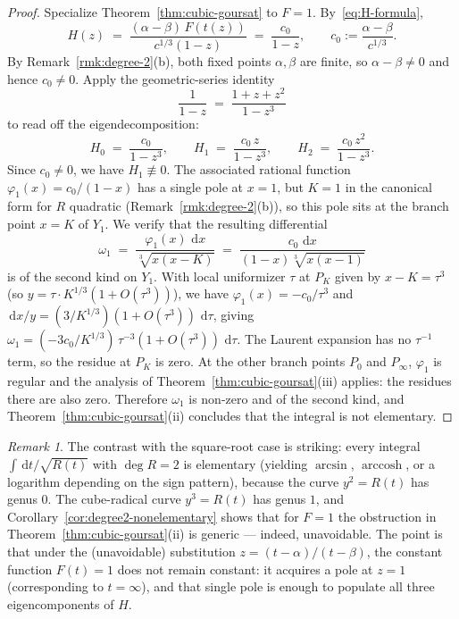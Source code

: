 \documentclass[11pt,a4paper]{article}
\theoremstyle{plain}
\theoremstyle{definition}
\theoremstyle{remark}
\newtheorem{remark}[theorem]{Remark}
\renewcommand{\d}{\,\mathrm{d}}
\begin{document}
\begin{proof}
Specialize Theorem~\ref{thm:cubic-goursat} to $F = 1$. By~\eqref{eq:H-formula},
\[
  H(z) \;=\; \frac{(\alpha-\beta)\,F(t(z))}{c^{1/3}(1-z)} \;=\; \frac{c_0}{1-z},\qquad c_0 := \frac{\alpha-\beta}{c^{1/3}}.
\]
By Remark~\ref{rmk:degree-2}(b), both fixed points $\alpha,\beta$ are finite, so $\alpha-\beta\neq 0$ and hence $c_0\neq 0$. Apply the geometric-series identity
\[
  \frac{1}{1-z} \;=\; \frac{1+z+z^2}{1-z^3}
\]
to read off the eigendecomposition:
\[
  H_0 \;=\; \frac{c_0}{1-z^3}, \qquad H_1 \;=\; \frac{c_0\,z}{1-z^3}, \qquad H_2 \;=\; \frac{c_0\,z^2}{1-z^3}.
\]
Since $c_0\neq 0$, we have $H_1\not\equiv 0$. The associated rational function $\varphi_1(x) = c_0/(1-x)$ has a single pole at $x = 1$, but $K=1$ in the canonical form for $R$ quadratic (Remark~\ref{rmk:degree-2}(b)), so this pole sits at the branch point $x = K$ of $Y_1$. We verify that the resulting differential
\[
  \omega_1 \;=\; \frac{\varphi_1(x)\,\d x}{\sqrt[3]{x(x-K)}} \;=\; \frac{c_0\,\d x}{(1-x)\sqrt[3]{x(x-1)}}
\]
is of the second kind on $Y_1$. With local uniformizer $\tau$ at $P_K$ given by $x - K = \tau^3$ (so $y = \tau\cdot K^{1/3}(1+O(\tau^3))$), we have $\varphi_1(x) = -c_0/\tau^3$ and $\d x/y = (3/K^{1/3})(1+O(\tau^3))\,\d\tau$, giving $\omega_1 = (-3 c_0/K^{1/3})\,\tau^{-3}(1+O(\tau^3))\,\d\tau$. The Laurent expansion has no $\tau^{-1}$ term, so the residue at $P_K$ is zero. At the other branch points $P_0$ and $P_\infty$, $\varphi_1$ is regular and the analysis of Theorem~\ref{thm:cubic-goursat}(iii) applies: the residues there are also zero. Therefore $\omega_1$ is non-zero and of the second kind, and Theorem~\ref{thm:cubic-goursat}(ii) concludes that the integral is not elementary.
\end{proof}

\begin{remark}
The contrast with the square-root case is striking: every integral $\int\d t/\sqrt{R(t)}$ with $\deg R = 2$ is elementary (yielding $\arcsin$, $\operatorname{arccosh}$, or a logarithm depending on the sign pattern), because the curve $y^2 = R(t)$ has genus $0$. The cube-radical curve $y^3 = R(t)$ has genus $1$, and Corollary~\ref{cor:degree2-nonelementary} shows that for $F=1$ the obstruction in Theorem~\ref{thm:cubic-goursat}(ii) is generic — indeed, unavoidable. The point is that under the (unavoidable) substitution $z = (t-\alpha)/(t-\beta)$, the constant function $F(t) = 1$ does not remain constant: it acquires a pole at $z = 1$ (corresponding to $t = \infty$), and that single pole is enough to populate all three eigencomponents of $H$.
\end{remark}
\end{document}
